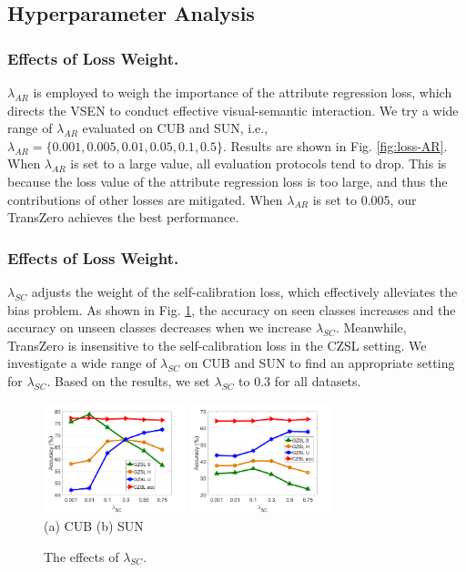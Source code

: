 \documentclass[letterpaper]{article} %
\begin{document}
	
	
	
	
	\subsection{Hyperparameter Analysis}\label{sec4.4}	
	\subsubsection{Effects of Loss Weight.} $\lambda_{AR}$ is employed to weigh the importance of the attribute regression loss, which directs the VSEN to conduct effective visual-semantic interaction. We try a wide range of $\lambda_{AR}$ evaluated on CUB and SUN, i.e., $\lambda_{AR}=\{0.001,0.005,0.01,0.05,0.1,0.5\}$. Results are shown in Fig. \ref{fig:loss-AR}. When $\lambda_{AR}$ is set to a large value, all evaluation protocols tend to drop. This is because the loss value of the attribute regression loss is too large, and thus the contributions of other losses are mitigated. When $\lambda_{AR}$ is set to 0.005, our TransZero achieves the best performance.
	
	\subsubsection{Effects of Loss Weight.} $\lambda_{SC}$ adjusts the weight of the self-calibration loss, which effectively alleviates the bias problem. As shown in Fig. \ref{fig:loss-SC}, the accuracy on seen classes increases and the accuracy on unseen classes decreases when we increase $\lambda_{SC}$. Meanwhile, TransZero is insensitive to the self-calibration loss in the CZSL setting. We investigate a wide range of $\lambda_{SC}$ on CUB and SUN to find an appropriate setting for $\lambda_{SC}$.  Based on the results, we set $\lambda_{SC}$ to 0.3 for all datasets.
	
	
	\begin{figure}[t]
		\begin{center}
			\includegraphics[width=4.1cm,height=3.2cm]{./figures/CUB-SC.png}
			\includegraphics[width=4.1cm,height=3.2cm]{./figures/SUN-SC.png}\\
			(a) CUB \hspace{3cm} (b) SUN 
			\caption{The effects of $\lambda_{SC}$.}
			\label{fig:loss-SC}\vspace{-6mm}
		\end{center}
	\end{figure}
	
\end{document}
